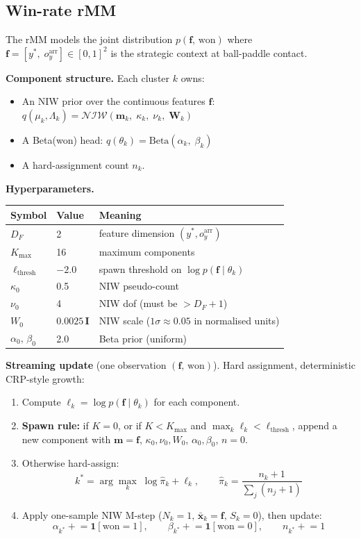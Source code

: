 \documentclass[12pt, a4paper]{article}
\newcommand{\1}{\mathbf{1}}
\newcommand{\cNIW}{\mathcal{NIW}}
\begin{document}
\subsection{Win-rate rMM}

The rMM models the joint distribution $p(\mathbf{f},\, \text{won})$ where
$\mathbf{f} = [y^*,\; o_y^\text{arr}] \in [0,1]^2$ is the strategic context at
ball-paddle contact.

\textbf{Component structure.}  Each cluster $k$ owns:
\begin{itemize}
  \item An NIW prior over the continuous features $\mathbf{f}$:
    $q(\mu_k, \Lambda_k) = \cNIW(\mathbf{m}_k,\; \kappa_k,\; \nu_k,\; \mathbf{W}_k)$
  \item A Beta(won) head:
    $q(\theta_k) = \text{Beta}(\alpha_k,\; \beta_k)$
  \item A hard-assignment count $n_k$.
\end{itemize}

\textbf{Hyperparameters.}

\begin{table}[ht]
\centering
\begin{tabular}{lll}
\toprule
Symbol & Value & Meaning \\
\midrule
$D_F$ & 2 & feature dimension $(y^*, o_y^\text{arr})$ \\
$K_\text{max}$ & 16 & maximum components \\
$\ell_\text{thresh}$ & $-2.0$ & spawn threshold on $\log p(\mathbf{f}\mid \theta_k)$ \\
$\kappa_0$ & 0.5 & NIW pseudo-count \\
$\nu_0$ & 4 & NIW dof (must be $> D_F + 1$) \\
$W_0$ & $0.0025\,\mathbf{I}$ & NIW scale ($1\sigma \approx 0.05$ in normalised units) \\
$\alpha_0,\,\beta_0$ & 2.0 & Beta prior (uniform) \\
\bottomrule
\end{tabular}
\end{table}

\textbf{Streaming update} (one observation $(\mathbf{f},\, \text{won})$).
Hard assignment, deterministic CRP-style growth:
\begin{enumerate}
  \item Compute $\ell_k = \log p(\mathbf{f}\mid \theta_k)$ for each component.
  \item \textbf{Spawn rule:} if $K = 0$, or if $K < K_\text{max}$ and
    $\max_k \ell_k < \ell_\text{thresh}$, append a new component with
    $\mathbf{m} = \mathbf{f}$, $\kappa_0, \nu_0, W_0$, $\alpha_0, \beta_0$,
    $n = 0$.
  \item Otherwise hard-assign:
    \[
    k^* = \arg\max_k\; \log\hat\pi_k + \ell_k,
    \qquad
    \hat\pi_k = \frac{n_k + 1}{\sum_j (n_j + 1)}
    \]
  \item Apply one-sample NIW M-step
    ($N_k{=}1,\, \bar{\mathbf{x}}_k = \mathbf{f},\, S_k = 0$), then update:
    \[
    \alpha_{k^*} \mathrel{+}= \1[\text{won}=1],
    \qquad
    \beta_{k^*}  \mathrel{+}= \1[\text{won}=0],
    \qquad
    n_{k^*} \mathrel{+}= 1
    \]
\end{enumerate}
\end{document}
